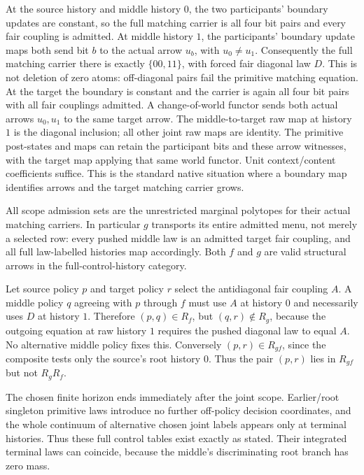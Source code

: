 \documentclass[11pt]{article}
\begin{document}
At the source history and middle history $0$, the two participants' boundary updates are constant, so the full matching carrier is all four bit pairs and every fair coupling is admitted. At middle history $1$, the participants' boundary update maps both send bit $b$ to the actual arrow $u_b$, with $u_0\ne u_1$. Consequently the full matching carrier there is exactly $\{00,11\}$, with forced fair diagonal law $D$. This is not deletion of zero atoms: off-diagonal pairs fail the primitive matching equation. At the target the boundary is constant and the carrier is again all four bit pairs with all fair couplings admitted. A change-of-world functor sends both actual arrows $u_0,u_1$ to the same target arrow. The middle-to-target raw map at history $1$ is the diagonal inclusion; all other joint raw maps are identity. The primitive post-states and maps can retain the participant bits and these arrow witnesses, with the target map applying that same world functor. Unit context/content coefficients suffice. This is the standard native situation where a boundary map identifies arrows and the target matching carrier grows.

All scope admission sets are the unrestricted marginal polytopes for their actual matching carriers. In particular $g$ transports its entire admitted menu, not merely a selected row: every pushed middle law is an admitted target fair coupling, and all full law-labelled histories map accordingly. Both $f$ and $g$ are valid structural arrows in the full-control-history category.

Let source policy $p$ and target policy $r$ select the antidiagonal fair coupling $A$. A middle policy $q$ agreeing with $p$ through $f$ must use $A$ at history $0$ and necessarily uses $D$ at history $1$. Therefore $(p,q)\in R_f$, but $(q,r)\notin R_g$, because the outgoing equation at raw history $1$ requires the pushed diagonal law to equal $A$. No alternative middle policy fixes this. Conversely $(p,r)\in R_{gf}$, since the composite tests only the source's root history $0$. Thus the pair $(p,r)$ lies in $R_{gf}$ but not $R_gR_f$.

The chosen finite horizon ends immediately after the joint scope. Earlier/root singleton primitive laws introduce no further off-policy decision coordinates, and the whole continuum of alternative chosen joint labels appears only at terminal histories. Thus these full control tables exist exactly as stated. Their integrated terminal laws can coincide, because the middle's discriminating root branch has zero mass.
\end{document}
